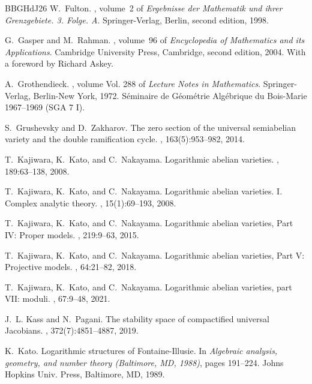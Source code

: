 \documentclass[11pt]{article}
\theoremstyle{definition}
\begin{document}
\begin{thebibliography}{BBGHdJ26}
W.~Fulton.
, volume~2 of {\em Ergebnisse der Mathematik und ihrer Grenzgebiete. 3. Folge. A}.
\newblock Springer-Verlag, Berlin, second edition, 1998.

G.~Gasper and M.~Rahman.
, volume~96 of {\em Encyclopedia of Mathematics and its Applications}.
\newblock Cambridge University Press, Cambridge, second edition, 2004.
\newblock With a foreword by Richard Askey.

A.~Grothendieck.
, volume Vol. 288 of {\em Lecture Notes in Mathematics}.
\newblock Springer-Verlag, Berlin-New York, 1972.
\newblock S\'eminaire de G\'eom\'etrie Alg\'ebrique du Bois-Marie 1967--1969 (SGA 7 I).

S.~Grushevsky and D.~Zakharov.
\newblock The zero section of the universal semiabelian variety and the double ramification cycle.
, 163(5):953--982, 2014.

T.~Kajiwara, K.~Kato, and C.~Nakayama.
\newblock Logarithmic abelian varieties.
, 189:63--138, 2008.

T.~Kajiwara, K.~Kato, and C.~Nakayama.
\newblock Logarithmic abelian varieties. {I}. {C}omplex analytic theory.
, 15(1):69--193, 2008.

T.~Kajiwara, K.~Kato, and C.~Nakayama.
\newblock Logarithmic abelian varieties, {P}art {IV}: {P}roper models.
, 219:9--63, 2015.

T.~Kajiwara, K.~Kato, and C.~Nakayama.
\newblock Logarithmic abelian varieties, {P}art {V}: {P}rojective models.
, 64:21--82, 2018.

T.~Kajiwara, K.~Kato, and C.~Nakayama.
\newblock Logarithmic abelian varieties, part {VII}: moduli.
, 67:9--48, 2021.

J.~L. Kass and N.~Pagani.
\newblock The stability space of compactified universal {J}acobians.
, 372(7):4851--4887, 2019.

K.~Kato.
\newblock Logarithmic structures of {F}ontaine-{I}llusie.
\newblock In {\em Algebraic analysis, geometry, and number theory ({B}altimore, {MD}, 1988)}, pages 191--224. Johns Hopkins Univ. Press, Baltimore, MD, 1989.


\end{thebibliography}
\end{document}
